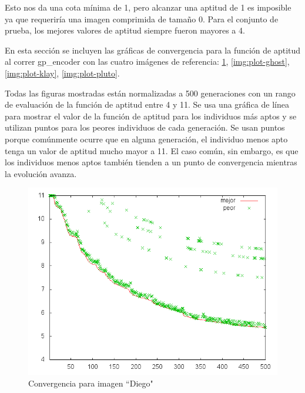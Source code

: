Esto nos da una cota mínima de 1, pero alcanzar una aptitud de 1 es imposible
ya que requeriría una imagen comprimida de tamaño 0. Para el conjunto de
prueba, los mejores valores de aptitud siempre fueron mayores a 4.

En esta sección se incluyen las gráficas de convergencia para la función de
aptitud al correr gp\_encoder con las cuatro imágenes de referencia:
\ref{img:plot-diego}, \ref{img:plot-ghost}, \ref{img:plot-klay}, \ref{img:plot-pluto}.

Todas las figuras mostradas están normalizadas a 500 generaciones con un rango
de evaluación de la función de aptitud entre 4 y 11. Se usa una gráfica de
línea para mostrar el valor de la función de aptitud para los individuos más
aptos y se utilizan puntos para los peores individuos de cada generación. Se
usan puntos porque comúnmente ocurre que en alguna generación, el individuo
menos apto tenga un valor de aptitud mucho mayor a 11. El caso común, sin
embargo, es que los individuos menos aptos también tienden a un punto de
convergencia mientras la evolución avanza.

\begin{figure}[b]
    \includegraphics[width=1.0\textwidth]{plot_diego}
    \caption{Convergencia para imagen ``Diego"}
    \label{img:plot-diego}
\end{figure}

